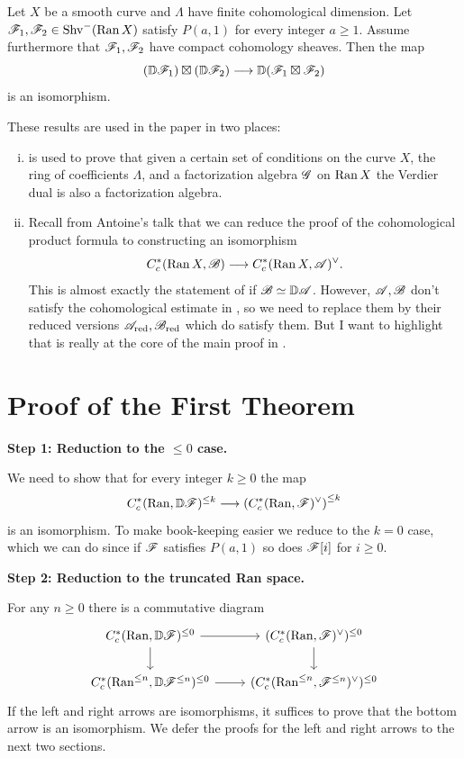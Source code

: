 \documentclass[oneside]{amsart}
\begin{document}
\begin{theorem}\label{thm:prod}
	Let $X$ be a smooth curve and $\Lambda$ have finite cohomological dimension. Let $\mathscr{F}_1,\mathscr{F}_2\in \operatorname{Shv}^{-}(\operatorname{Ran} X)$ satisfy $P(a,1)$ for every integer $a\ge 1$. Assume furthermore that $\mathscr{F}_1,\mathscr{F}_2$ have compact cohomology sheaves. Then the map
	\[
		(\VD\CF_1) \boxtimes (\VD\CF_2) \to \VD(\CF_1\boxtimes\CF_2)
	\] 
	is an isomorphism.
\end{theorem}

These results are used in the paper in two places:
\begin{enumerate}[(i)]
	\item {} is used to prove that given a certain set of conditions on the curve $X$, the ring of coefficients $\Lambda$, and a factorization algebra $\mathscr{G}$ on $\operatorname{Ran} X$ the Verdier dual is also a factorization algebra.
	\item Recall from Antoine's talk that we can reduce the proof of the cohomological product formula to constructing an isomorphism
		\[
		C^{*}_c(\Ran X, \CB) \to C^{*}_c(\Ran X, \CA)^{\vee}.
		\] 
		This is almost exactly the statement of  if $\mathscr{B}\simeq \mathbb{D}\mathscr{A}$. However, $\mathscr{A},\mathscr{B}$ don't satisfy the cohomological estimate in , so we need to replace them by their reduced versions $\mathscr{A}_{\mathrm{red}},\mathscr{B}_{\mathrm{red}}$ which do satisfy them. But I want to highlight that  is really at the core of the main proof in \cite{abott}.
\end{enumerate}

\section{Proof of the First Theorem}
\textbf{Step 1: Reduction to the $\le 0$ case.}

We need to show that for every integer $k\ge 0$ the map
\[
	C^{*}_c(\Ran, \VD\CF)^{\le k} \to \left(C^{*}_c(\Ran, \CF)^{\vee}\right)^{\le k}
\] 
is an isomorphism. To make book-keeping easier we reduce to the $k=0$ case, which we can do since if $\mathscr{F}$ satisfies $P(a,1)$ so does $\mathscr{F}[i]$ for $i\ge 0$.

\textbf{Step 2: Reduction to the truncated Ran space.}

For any $n\ge 0$ there is a commutative diagram
\[
\begin{tikzcd}
	C^{*}_c(\Ran, \VD\CF)^{\le 0} \ar[r] \ar[d] & (C^{*}_c(\Ran,\CF)^{\vee})^{\le 0} \ar[d] \\
	C^{*}_c(\Ran^{\le n},\VD\CF^{\le n})^{\le 0} \ar[r] & (C^{*}_c(\Ran^{\le n},\CF^{\le n})^{\vee})^{\le 0}
\end{tikzcd}
\] 
If the left and right arrows are isomorphisms, it suffices to prove that the bottom arrow is an isomorphism. We defer the proofs for the left and right arrows to the next two sections.
\end{document}

